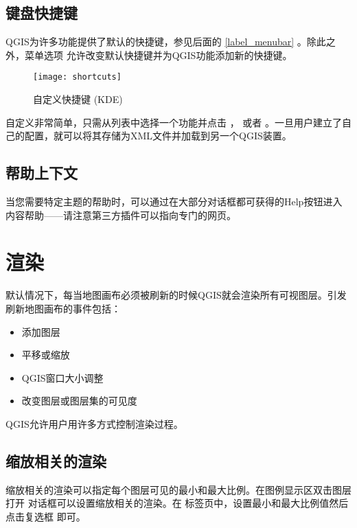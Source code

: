 \subsection{键盘快捷键}\label{shortcuts}

QGIS为许多功能提供了默认的快捷键，参见后面的 \ref{label_menubar} 。除此之外，菜单选项  \arrow
{} 允许改变默认快捷键并为QGIS功能添加新的快捷键。

\begin{figure}[ht]
   \centering
   \texttt{[image: shortcuts]}
   \caption{自定义快捷键 \nixcaption (KDE)} \label{fig:shortcuts}
\end{figure}

自定义非常简单，只需从列表中选择一个功能并点击  ，  或者  。一旦用户建立了自己的配置，就可以将其存储为XML文件并加载到另一个QGIS装置。

\subsection{帮助上下文}\label{context_help}

当您需要特定主题的帮助时，可以通过在大部分对话框都可获得的Help按钮进入内容帮助——请注意第三方插件可以指向专门的网页。

\section{渲染}\label{subsec:redraw_events}

默认情况下，每当地图画布必须被刷新的时候QGIS就会渲染所有可视图层。引发刷新地图画布的事件包括：

\begin{itemize}
\item 添加图层
\item 平移或缩放
\item QGIS窗口大小调整
\item 改变图层或图层集的可见度
\end{itemize}

QGIS允许用户用许多方式控制渲染过程。

\subsection{缩放相关的渲染}
\label{label_scaledepend}

缩放相关的渲染可以指定每个图层可见的最小和最大比例。在图例显示区双击图层打开  对话框可以设置缩放相关的渲染。在  标签页中，设置最小和最大比例值然后点击复选框  即可。

